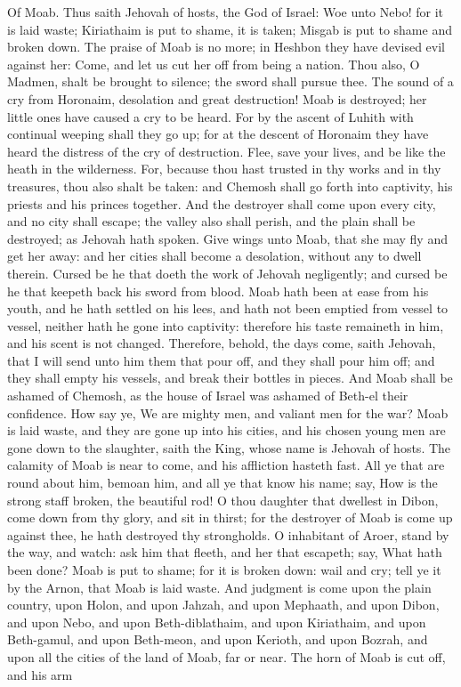 Of Moab. Thus saith Jehovah of hosts, the God of Israel: Woe unto Nebo! for it is laid waste; Kiriathaim is put to shame, it is taken; Misgab is put to shame and broken down. The praise of Moab is no more; in Heshbon they have devised evil against her: Come, and let us cut her off from being a nation. Thou also, O Madmen, shalt be brought to silence; the sword shall pursue thee. The sound of a cry from Horonaim, desolation and great destruction! Moab is destroyed; her little ones have caused a cry to be heard. For by the ascent of Luhith with continual weeping shall they go up; for at the descent of Horonaim they have heard the distress of the cry of destruction. Flee, save your lives, and be like the heath in the wilderness. For, because thou hast trusted in thy works and in thy treasures, thou also shalt be taken: and Chemosh shall go forth into captivity, his priests and his princes together. And the destroyer shall come upon every city, and no city shall escape; the valley also shall perish, and the plain shall be destroyed; as Jehovah hath spoken. Give wings unto Moab, that she may fly and get her away: and her cities shall become a desolation, without any to dwell therein. Cursed be he that doeth the work of Jehovah negligently; and cursed be he that keepeth back his sword from blood.  Moab hath been at ease from his youth, and he hath settled on his lees, and hath not been emptied from vessel to vessel, neither hath he gone into captivity: therefore his taste remaineth in him, and his scent is not changed. Therefore, behold, the days come, saith Jehovah, that I will send unto him them that pour off, and they shall pour him off; and they shall empty his vessels, and break their bottles in pieces. And Moab shall be ashamed of Chemosh, as the house of Israel was ashamed of Beth-el their confidence. How say ye, We are mighty men, and valiant men for the war? Moab is laid waste, and they are gone up into his cities, and his chosen young men are gone down to the slaughter, saith the King, whose name is Jehovah of hosts. The calamity of Moab is near to come, and his affliction hasteth fast. All ye that are round about him, bemoan him, and all ye that know his name; say, How is the strong staff broken, the beautiful rod! O thou daughter that dwellest in Dibon, come down from thy glory, and sit in thirst; for the destroyer of Moab is come up against thee, he hath destroyed thy strongholds. O inhabitant of Aroer, stand by the way, and watch: ask him that fleeth, and her that escapeth; say, What hath been done? Moab is put to shame; for it is broken down: wail and cry; tell ye it by the Arnon, that Moab is laid waste. And judgment is come upon the plain country, upon Holon, and upon Jahzah, and upon Mephaath, and upon Dibon, and upon Nebo, and upon Beth-diblathaim, and upon Kiriathaim, and upon Beth-gamul, and upon Beth-meon, and upon Kerioth, and upon Bozrah, and upon all the cities of the land of Moab, far or near. The horn of Moab is cut off, and his arm 